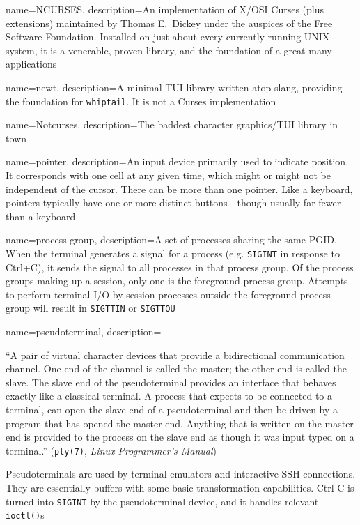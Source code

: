{
  name={NCURSES},
description={An implementation of X/OSI Curses (plus extensions) maintained by
  Thomas E.\ Dickey under the auspices of the Free Software Foundation.
  Installed on just about every currently-running UNIX system, it is a
  venerable, proven library, and the foundation of a great many applications}
}

{
  name={newt},
description={A minimal TUI library written atop slang, providing the foundation
  for \texttt{whiptail}. It is not a Curses implementation}
}

{
  name={Notcurses},
description={The baddest character graphics/TUI library in town}
}

{
  name={pointer},
description={An input device primarily used to indicate position. It
  corresponds with one cell at any given time, which might or might not be
  independent of the cursor. There can be more than one pointer. Like a
  \gls{keyboard}, pointers typically have one or more distinct buttons---though
  usually far fewer than a keyboard}
}

{
  name={process group},
description={A set of processes sharing the same PGID. When the terminal
  generates a signal for a process (e.g. \texttt{SIGINT} in response to Ctrl+C), it
  sends the signal to all processes in that process group. Of the process
  groups making up a session, only one is the foreground process group.
  Attempts to perform terminal I/O by session processes outside the foreground
  process group will result in \texttt{SIGTTIN} or \texttt{SIGTTOU}}
}

{
  name={pseudoterminal},
description={``A pair of virtual character devices that provide a
  bidirectional communication channel. One end of the channel is called the
  master; the other end is called the slave. The slave end of the
  pseudoterminal provides an interface that behaves exactly like a classical
  terminal. A process that expects to be connected to a terminal, can open
  the slave end of a pseudoterminal and then be driven by a program that has
  opened the master end. Anything that is written on the master end is
  provided to the process on the slave end as though it was input typed on a
  terminal.'' (\texttt{pty(7)}, \textit{Linux Programmer's Manual}\cite{pty7})

 Pseudoterminals are used by terminal emulators and interactive SSH
  connections. They are essentially buffers with some basic transformation
  capabilities. Ctrl-C is turned into \texttt{SIGINT} by the pseudoterminal device,
  and it handles relevant \texttt{ioctl()}s}
}

